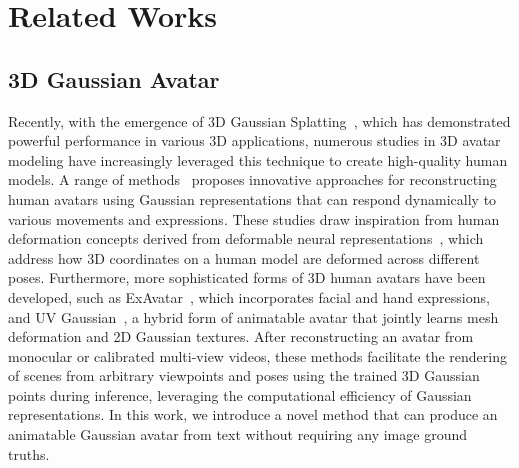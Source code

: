 \section{Related Works}
\subsection{3D Gaussian Avatar}

Recently, with the emergence of 3D Gaussian Splatting~\cite{kerbl20233d}, which has demonstrated powerful performance in various 3D applications, numerous studies in 3D avatar modeling have increasingly leveraged this technique to create high-quality human models. A range of methods~\cite{hu2024gauhuman, hu2024gaussianavatar, lei2024gart, qian20233dgs, zielonka2023drivable} proposes innovative approaches for reconstructing human avatars using Gaussian representations that can respond dynamically to various movements and expressions. 
These studies draw inspiration from human deformation concepts derived from deformable neural representations~\cite{gao2023neural, peng2021neural, peng2021animatable, weng2022humannerf}, which address how 3D coordinates on a human model are deformed across different poses.
Furthermore, more sophisticated forms of 3D human avatars have been developed, such as ExAvatar~\cite{moon2024expressive}, which incorporates facial and hand expressions, and UV Gaussian~\cite{jiang2024uv}, a hybrid form of animatable avatar that jointly learns mesh deformation and 2D Gaussian textures.
After reconstructing an avatar from monocular or calibrated multi-view videos, these methods facilitate the rendering of scenes from arbitrary viewpoints and poses using the trained 3D Gaussian points during inference, leveraging the computational efficiency of Gaussian representations. 
In this work, we introduce a novel method that can produce an animatable Gaussian avatar from text without requiring any image ground truths.

